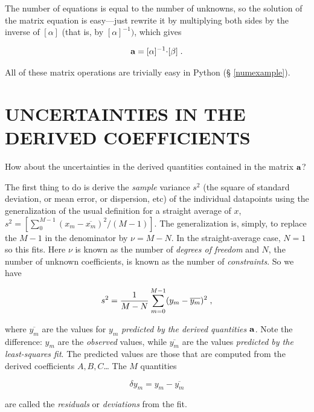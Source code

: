 \documentclass[psfig,preprint]{aastex}
\begin{document}
	The number of equations is equal to the number of unknowns, so
the solution of the matrix equation is easy---just rewrite it by
multiplying both sides by the inverse of $[\alpha]$ (that is, by
$[\alpha]^{-1})$, which gives

\begin{equation}
\label{adef}
{\bf a} = [\alpha]^{-1} \mathbf{ \cdot [\beta]} \; .
\end{equation}

\noindent All of these matrix operations are trivially easy in Python (\S
\ref{numexample}). 

\section{UNCERTAINTIES IN THE DERIVED COEFFICIENTS} \label{sigmas}

	How about the uncertainties in the derived quantities contained
in the matrix ${\bf a}$?

       The first thing to do is derive the {\it sample} variance $s^2$
(the square of standard deviation, or mean error, or dispersion, etc) of
the individual datapoints using the generalization of the usual
definition for a straight average of $x$, $s^2 = [ \sum_0^{M-1} (x_m -
\overline{ x_m})^2/(M-1)]$.  The generalization is, simply, to replace   
the $M-1$ in the denominator by $\nu = M-N$.  In the straight-average
case, $N=1$ so this fits. Here $\nu$ is known as the number of {\it
degrees of freedom} and $N$, the number of unknown coefficients, is
known as the number of {\it constraints}. So we have

\begin{equation} \label{samplevarianceone}
s^2 = {1 \over M - N} \sum_{m=0}^{M-1} (y_m -
\overline{y_m})^2 \; ,
\end{equation}  

\noindent where $\overline{y_m}$ are the values for $y_m$ {\it
predicted by the derived quantities ${\bf a}$}. Note the difference:
$y_m$ are the {\it observed} values, while $\overline{y_m}$ are the
values {\it predicted by the least-squares fit}.  The predicted values
are those that are computed from the derived coefficients $A, B, C$\dots
The $M$ quantities

\begin{equation} \label{sequation}
\delta y_m = y_m - \overline{y_m}
\end{equation}

\noindent are called the {\it residuals} or {\it deviations} from the
fit.
\end{document}
